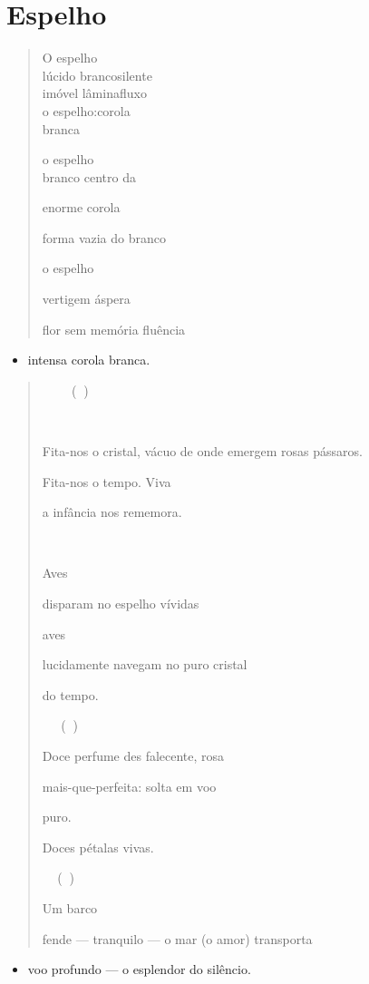 \chapter{Espelho}

\begin{verse}
O espelho\\
lúcido branco\qquad silente\\
imóvel lâmina\qquad fluxo\\
o espelho:\qquad\qquad corola\\
\qquad\qquad\qquad\qquad branca

o espelho\\
branco centro da

enorme corola

forma vazia do branco

o espelho

vertigem áspera

flor sem memória fluência
\end{verse}

\begin{itemize}
\item
  intensa corola branca.
\end{itemize}

\begin{quote}
 ()



Fita-nos o cristal, vácuo de onde emergem rosas pássaros.

Fita-nos o tempo. Viva

a infância nos rememora.



Aves

disparam no espelho vívidas

aves

lucidamente navegam no puro cristal

do tempo.

 ()

Doce perfume des falecente, rosa

mais-que-perfeita: solta em voo

puro.

Doces pétalas vivas.

 ()

Um barco

fende --- tranquilo --- o mar (o amor) transporta
\end{quote}

\begin{itemize}
\item
  voo profundo --- o esplendor do silêncio.
\end{itemize}

